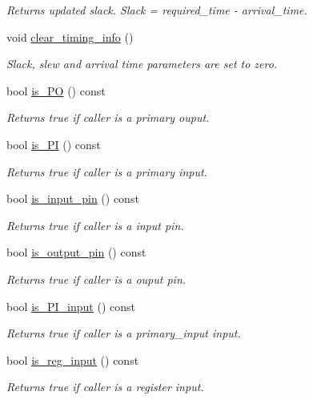 \begin{DoxyCompactItemize}
\begin{DoxyCompactList}\small\item\em Returns updated slack. Slack = required\-\_\-time -\/ arrival\-\_\-time. \end{DoxyCompactList}\item 
void \hyperlink{classTiming__Analysis_1_1Timing__Point_a737bfc39dc3271c9b605d1d16ba8816c}{clear\-\_\-timing\-\_\-info} ()
\begin{DoxyCompactList}\small\item\em Slack, slew and arrival time parameters are set to zero. \end{DoxyCompactList}\item 
bool \hyperlink{classTiming__Analysis_1_1Timing__Point_a2223c8ec07ef018d39db5c7e03df90a9}{is\-\_\-\-P\-O} () const 
\begin{DoxyCompactList}\small\item\em Returns true if caller is a primary ouput. \end{DoxyCompactList}\item 
bool \hyperlink{classTiming__Analysis_1_1Timing__Point_a0c943d53edbf2fbffa188ebf883a5b9f}{is\-\_\-\-P\-I} () const 
\begin{DoxyCompactList}\small\item\em Returns true if caller is a primary input. \end{DoxyCompactList}\item 
bool \hyperlink{classTiming__Analysis_1_1Timing__Point_aebb2497a057619c1cc9206253238f969}{is\-\_\-input\-\_\-pin} () const 
\begin{DoxyCompactList}\small\item\em Returns true if caller is a input pin. \end{DoxyCompactList}\item 
bool \hyperlink{classTiming__Analysis_1_1Timing__Point_a5c8883bd6dae6b49cb5c80e16b612d70}{is\-\_\-output\-\_\-pin} () const 
\begin{DoxyCompactList}\small\item\em Returns true if caller is a ouput pin. \end{DoxyCompactList}\item 
bool \hyperlink{classTiming__Analysis_1_1Timing__Point_a1353ea265660f4bada0367f9a0d4251c}{is\-\_\-\-P\-I\-\_\-input} () const 
\begin{DoxyCompactList}\small\item\em Returns true if caller is a primary\-\_\-input input. \end{DoxyCompactList}\item 
bool \hyperlink{classTiming__Analysis_1_1Timing__Point_aabcd5ebf7151be22c98753d16f26c84c}{is\-\_\-reg\-\_\-input} () const 
\begin{DoxyCompactList}\small\item\em Returns true if caller is a register input. \end{DoxyCompactList}\end{DoxyCompactItemize}
